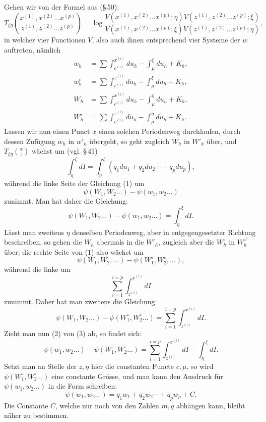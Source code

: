 \documentclass[10pt]{article}
\begin{document}
Gehen wir von der Formel aus (\S\,50):
\[
\tag{1}T_{\xi\eta}\binom{x^{(1)},x^{(2)}\ldots x^{(p)}}{z^{(1)},z^{(2)}\ldots z^{(p)}}
=\log\frac{V(x^{(1)},x^{(2)}\ldots x^{(p)};\eta)V(z^{(1)},z^{(2)}\ldots z^{(p)};\xi)}{V(x^{(1)},x^{(2)}\ldots x^{(p)};\xi)V(z^{(1)},z^{(2)}\ldots z^{(p)};\eta)},
\]
in welcher vier Functionen \(V\), also auch ihnen entsprechend vier Systeme der \(w\) auftreten, nämlich
\[
\begin{aligned}
w_h&=\sum\int_{c^{(i)}}^{x^{(i)}}du_h-\int_{\mu}^{\xi}du_h+K_h,\\
w_h^{\circ}&=\sum\int_{c^{(i)}}^{z^{(i)}}du_h-\int_{\mu}^{\xi}du_h+K_h,\\
W_h&=\sum\int_{c^{(i)}}^{x^{(i)}}du_h-\int_{\mu}^{\eta}du_h+K_h,\\
W_h^{\circ}&=\sum\int_{c^{(i)}}^{z^{(i)}}du_h-\int_{\mu}^{\eta}du_h+K_h.
\end{aligned}
\]
Lassen wir nun einen Punct \(x\) einen solchen Periodenweg durchlaufen, durch dessen Zufügung \(w_h\) in \(w'_h\) übergeht, so geht zugleich \(W_h\) in \(W'_h\) über, und \(T_{\xi\eta}\binom{x}{z}\) wächst um (vgl. \S\,41)
\[
\int_{\eta}^{\xi}dI=\int_{\eta}^{\xi}(q_1du_1+q_2du_2\cdots+q_pdu_p),
\]
während die linke Seite der Gleichung (1) um
\[
\psi(W_1,W_2\ldots)-\psi(w_1,w_2\ldots)
\]
zunimmt. Man hat daher die Gleichung:
\[
\tag{2}\psi(W_1,W_2\ldots)-\psi(w_1,w_2\ldots)=\int_{\eta}^{\xi}dI.
\]
Lässt man zweitens \(\eta\) denselben Periodenweg, aber in entgegengesetzter Richtung beschreiben, so gehen die \(W_h\) abermals in die \(W'_h\), zugleich aber die \(W_h^{\circ}\) in \(W_h^{\circ\prime}\) über; die rechte Seite von (1) also wächst um
\[
\psi(W_1,W_2,\ldots)-\psi(W_1^{\circ},W_2^{\circ},\ldots),
\]
während die linke um
\[
\sum_{i=1}^{i=p}\int_{z^{(i)}}^{x^{(i)}}dI
\]
zunimmt. Daher hat man zweitens die Gleichung
\[
\tag{3}\psi(W_1,W_2\ldots)-\psi(W_1^{\circ},W_2^{\circ}\ldots)=\sum_{i=1}^{i=p}\int_{z^{(i)}}^{x^{(i)}}dI.
\]
Zieht man nun (2) von (3) ab, so findet sich:
\[
\psi(w_1,w_2\ldots)-\psi(W_1^{\circ},W_2^{\circ}\ldots)=\sum_{i=1}^{i=p}\int_{z^{(i)}}^{x^{(i)}}dI-\int_{\eta}^{\xi}dI.
\]
Setzt man an Stelle der \(z,\eta\) hier die constanten Puncte \(c,\mu\), so wird \(\psi(W_1^{\circ},W_2^{\circ}\ldots)\) eine constante Grösse, und man kann den Ausdruck für \(\psi(w_1,w_2\ldots)\) in die Form schreiben:
\[
\tag{4}\psi(w_1,w_2\ldots)=q_1w_1+q_2w_2\cdots+q_pw_p+C.
\]
Die Constante \(C\), welche nur noch von den Zahlen \(m,q\) abhängen kann, bleibt näher zu bestimmen.
\end{document}
